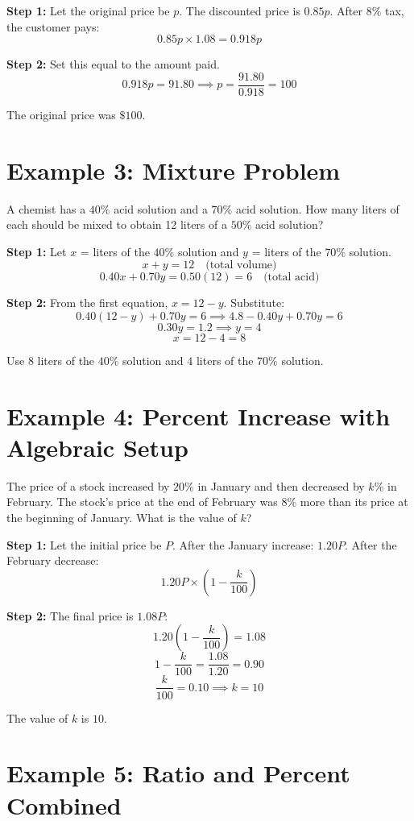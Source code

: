 \documentclass[14pt]{extarticle}
\begin{document}
\textbf{Step 1:} Let the original price be \(p\). The discounted price is \(0.85p\). After \(8\%\) tax, the customer pays:
\[
0.85p \times 1.08 = 0.918p
\]

\textbf{Step 2:} Set this equal to the amount paid.
\[
0.918p = 91.80 \implies p = \frac{91.80}{0.918} = 100
\]

The original price was \(\boxed{\$100}\).

\section*{Example 3: Mixture Problem}

A chemist has a \(40\%\) acid solution and a \(70\%\) acid solution. How many liters of each should be mixed to obtain 12 liters of a \(50\%\) acid solution?

\textbf{Step 1:} Let \(x\) = liters of the \(40\%\) solution and \(y\) = liters of the \(70\%\) solution.
\[
x + y = 12 \quad \text{(total volume)}
\]
\[
0.40x + 0.70y = 0.50(12) = 6 \quad \text{(total acid)}
\]

\textbf{Step 2:} From the first equation, \(x = 12 - y\). Substitute:
\[
0.40(12 - y) + 0.70y = 6 \implies 4.8 - 0.40y + 0.70y = 6
\]
\[
0.30y = 1.2 \implies y = 4
\]
\[
x = 12 - 4 = 8
\]

Use \(\boxed{8}\) liters of the \(40\%\) solution and \(\boxed{4}\) liters of the \(70\%\) solution.

\section*{Example 4: Percent Increase with Algebraic Setup}

The price of a stock increased by \(20\%\) in January and then decreased by \(k\%\) in February. The stock's price at the end of February was \(8\%\) more than its price at the beginning of January. What is the value of \(k\)?

\textbf{Step 1:} Let the initial price be \(P\). After the January increase: \(1.20P\). After the February decrease:
\[
1.20P \times \left(1 - \frac{k}{100}\right)
\]

\textbf{Step 2:} The final price is \(1.08P\):
\[
1.20\left(1 - \frac{k}{100}\right) = 1.08
\]
\[
1 - \frac{k}{100} = \frac{1.08}{1.20} = 0.90
\]
\[
\frac{k}{100} = 0.10 \implies k = 10
\]

The value of \(k\) is \(\boxed{10}\).

\section*{Example 5: Ratio and Percent Combined}
\end{document}
